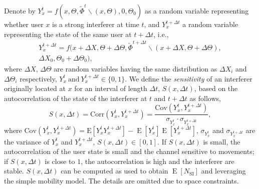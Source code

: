 \documentclass[10pt, conference, letterpaper]{IEEEtran}
\DeclareMathOperator*{\E}{\mathrm{E}}
\DeclareMathOperator*{\SI}{\mathrm{SI}}
\begin{document}
Denote by $Y_x^t=f(x, \Theta, \tilde{\Phi}^t\backslash (x, \Theta), 0, \Theta_0)$ as a random variable representing whether user $x$ is a strong interferer at time $t$, and $Y_x^{t+\Delta t}$ a random variable representing the state of the same user at $t+\Delta t$, i.e.,
\begin{multline*}
Y_{x}^{t+\Delta t} = f(x+\Delta X, \Theta + \Delta\Theta, \tilde{\Phi}^{t+\Delta t}\backslash (x+\Delta X, \Theta + \Delta\Theta), \\
\Delta X_0, \Theta_0 + \Delta\Theta_0),
\end{multline*}
where $\Delta X$, $\Delta \Theta$ are random variables having the same distribution as $\Delta X_i$ and $\Delta\Theta_i$ respectively,
$Y_x^t \mathrm{~and~} Y_{x}^{t+\Delta t} \in \{0,1\}$.
We define the \emph{sensitivity} of an interferer originally located at $x$ for an interval of length $\Delta t$, $S(x, \Delta t)$, based on the autocorrelation of the state of the interferer at $t$ and $t+\Delta t$ as follows, 
\begin{equation}
S(x, \Delta t)
=\mathrm{Corr}(Y_x^t, Y_x^{t+\Delta t})
=\frac{\mathrm{Cov}(Y_x^t, Y_x^{t+\Delta t})}{\sigma_{Y_x^t}\cdot \sigma_{Y_x^{t+\Delta t}}},
\end{equation}
where $\mathrm{Cov}(Y_x^t, Y_x^{t+\Delta t}) = \mathrm{E}[Y_x^t Y_x^{t + \Delta t}] - \E[Y_x^t]\E[Y_x^{t+\Delta t}]$, $\sigma_{Y_x^t}$ and $\sigma_{Y_x^{t+\Delta t}}$ are the variance of $Y_x^t$ and $Y_x^{t+\Delta t}$, $S(x, \Delta t)\in [0,1]$. If $S(x, \Delta t)$ is small, the autocorrelation of the user state is small and the channel sensitive to movements; if $S(x, \Delta t)$ is close to $1$, the autocorrelation is high and the interferer are stable. 
$S(x, \Delta t)$ can be computed as used to obtain $\E[N_{\SI}]$ and leveraging the simple mobility model. 
The details are omitted due to space constraints.


\end{document}
